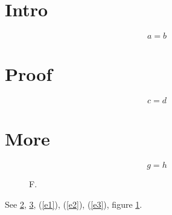 \documentclass[12pt]{iopart}
\begin{document}
\section{Intro}
\begin{equation}a=b\label{e1}\end{equation}
\appendix
\section{Proof}\label{app}
\begin{equation}c=d\label{e2}\end{equation}
\section{More}\label{app2}
\begin{equation}g=h\label{e3}\end{equation}
\begin{figure}\caption{F.}\label{f}\end{figure}
See \ref{app}, \ref{app2}, (\ref{e1}), (\ref{e2}), (\ref{e3}), figure \ref{f}.
\end{document}
